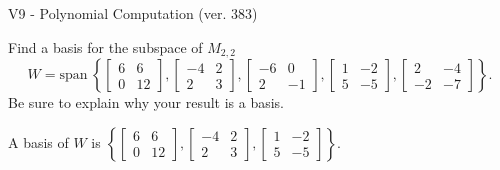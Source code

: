 \begin{exercise}
  \begin{exerciseTitle}V9 - Polynomial Computation (ver. 383)\end{exerciseTitle}
  \begin{exerciseStatement}
    Find a basis for the subspace of \(M_{2,2}\) 
\[W=\mathrm{span}\ \left\{\left[\begin{array}{cc}
6 & 6 \\
0 & 12
\end{array}\right] , \left[\begin{array}{cc}
-4 & 2 \\
2 & 3
\end{array}\right] , \left[\begin{array}{cc}
-6 & 0 \\
2 & -1
\end{array}\right] , \left[\begin{array}{cc}
1 & -2 \\
5 & -5
\end{array}\right] , \left[\begin{array}{cc}
2 & -4 \\
-2 & -7
\end{array}\right]\right\}.\]
 Be sure to explain why your result is a basis.


  \end{exerciseStatement}
  \begin{exerciseAnswer}
   A basis of \(W\) is  \(\left\{\left[\begin{array}{cc}
6 & 6 \\
0 & 12
\end{array}\right] , \left[\begin{array}{cc}
-4 & 2 \\
2 & 3
\end{array}\right] , \left[\begin{array}{cc}
1 & -2 \\
5 & -5
\end{array}\right]\right\}\).
  


  \end{exerciseAnswer}
\end{exercise}